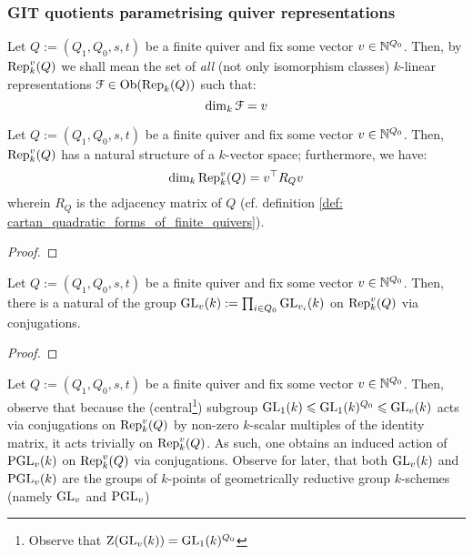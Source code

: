         \subsubsection{GIT quotients parametrising quiver representations}
            \begin{convention}
                Let $Q := (Q_1, Q_0, s, t)$ be a finite quiver and fix some vector $v \in \mathbb{N}^{Q_0}$. Then, by $\mathrm{Rep}_k^v(Q)$ we shall mean the set of \textit{all} (not only isomorphism classes) $k$-linear representations $\mathcal{F} \in \mathrm{Ob}(\mathrm{Rep}_k(Q))$ such that:
                    $$\dim_k \mathcal{F} = v$$
            \end{convention}
            \begin{proposition} \label{prop: dimensions_of_representation_spaces_of_finite_quivers}
                Let $Q := (Q_1, Q_0, s, t)$ be a finite quiver and fix some vector $v \in \mathbb{N}^{Q_0}$. Then, $\mathrm{Rep}_k^v(Q)$ has a natural structure of a $k$-vector space; furthermore, we have:
                    $$\dim_k \mathrm{Rep}_k^v(Q) = v^{\top} R_Q v$$
                wherein $R_Q$ is the adjacency matrix of $Q$ (cf. definition \ref{def: cartan_quadratic_forms_of_finite_quivers}).
            \end{proposition}
                \begin{proof}
                            
                \end{proof}
            \begin{corollary} \label{coro: general_linear_group_action_on_quiver_representations}
                Let $Q := (Q_1, Q_0, s, t)$ be a finite quiver and fix some vector $v \in \mathbb{N}^{Q_0}$. Then, there is a natural of the group $\mathrm{GL}_v(k) := \prod_{i \in Q_0} \mathrm{GL}_{v_i}(k)$ on $\mathrm{Rep}_k^v(Q)$ via conjugations. 
            \end{corollary}
                \begin{proof}
                    
                \end{proof}
            \begin{remark} \label{remark: general_linear_group_action_on_quiver_representations}
                Let $Q := (Q_1, Q_0, s, t)$ be a finite quiver and fix some vector $v \in \mathbb{N}^{Q_0}$. Then, observe that because the (central\footnote{Observe that $\mathrm{Z}(\mathrm{GL}_v(k)) = \mathrm{GL}_1(k)^{Q_0}$}) subgroup $\mathrm{GL}_1(k) \leqslant \mathrm{GL}_1(k)^{Q_0} \leqslant \mathrm{GL}_v(k)$ acts via conjugations on $\mathrm{Rep}_k^v(Q)$ by non-zero $k$-scalar multiples of the identity matrix, it acts trivially on $\mathrm{Rep}_k^v(Q)$. As such, one obtains an induced action of $\mathrm{PGL}_v(k)$ on $\mathrm{Rep}_k^v(Q)$ via conjugations. Observe for later, that both $\mathrm{GL}_v(k)$ and $\mathrm{PGL}_v(k)$ are the groups of $k$-points of geometrically reductive group $k$-schemes (namely $\mathrm{GL}_v$ and $\mathrm{PGL}_v$)
            \end{remark}
